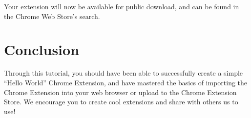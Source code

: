 \documentclass[11pt]{article}
\begin{document}
Your extension will now be available for public download, and can be found in the Chrome Web Store's search.

\section{Conclusion}

Through this tutorial, you should have been able to successfully create a simple ``Hello World'' Chrome Extension, and have mastered the basics of importing the Chrome Extension into your web browser or upload to the Chrome Extension Store. We encourage you to create cool extensions and share with others us to use!
\end{document}

